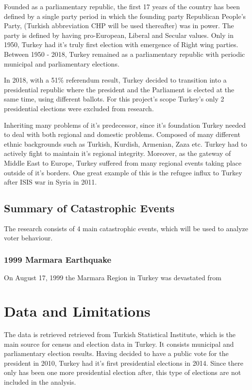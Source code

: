 \documentclass[12pt]{article}
\begin{document}
Founded as a parliamentary republic, the first 17 years of the country has been defined by a single party period in which the founding party Republican People's Party, (Turkish abbreviation CHP will be used thereafter) was in power. The party is defined by having pro-European, Liberal and Secular values. Only in 1950, Turkey had it's truly first election with emergence of Right wing parties. Between 1950 - 2018, Turkey remained as a parliamentary republic with periodic municipal and parliamentary elections.

In 2018, with a 51\% referendum result, Turkey decided to transition into a presidential republic where the president and the Parliament is elected at the same time, using different ballots. For this project's scope Turkey's only 2 presidential elections were excluded from research. 

Inheriting many problems of it's predecessor, since it's foundation Turkey needed to deal with both regional and domestic problems. Composed of many different ethnic backgrounds such as Turkish, Kurdish, Armenian, Zaza etc. Turkey had to actively fight to maintain it's regional integrity. Moreover, as the gateway of Middle East to Europe, Turkey suffered from many regional events taking place outside of it's borders. One great example of this is the refugee influx to Turkey after ISIS war in Syria in 2011. 

\subsection{Summary of Catastrophic Events}

The research consists of 4 main catastrophic events, which will be used to analyze voter behaviour. 

\subsubsection{1999 Marmara Earthquake}



On August 17, 1999 the Marmara Region in Turkey was devastated from 





\section{Data and Limitations}

The data is retrieved retrieved from Turkish Statistical Institute, which is the main source for census and election data in Turkey. It consists municipal and parliamentary election results. Having decided to have a public vote for the president in 2010, Turkey had it's first presidential elections in 2014. Since there only has been one more presidential election after, this type of elections are not included in the analysis. 
\end{document}
